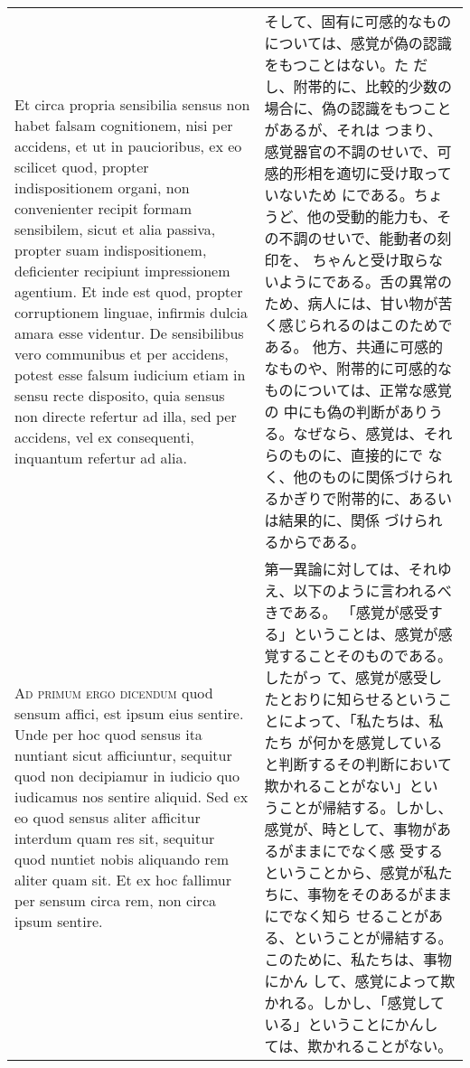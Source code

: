 \documentclass[paper=a4paper,fontsize=10pt,jafontsize=9pt,titlepage]{jlreq}
\begin{document}
\begin{longtable}{p{21em}p{21em}}
\\



Et circa propria sensibilia sensus
non habet falsam cognitionem, nisi per accidens, et ut in paucioribus,
ex eo scilicet quod, propter indispositionem organi, non convenienter
recipit formam sensibilem, sicut et alia passiva, propter suam
indispositionem, deficienter recipiunt impressionem agentium. Et inde
est quod, propter corruptionem linguae, infirmis dulcia amara esse
videntur. De sensibilibus vero communibus et per accidens, potest esse
falsum iudicium etiam in sensu recte disposito, quia sensus non directe
refertur ad illa, sed per accidens, vel ex consequenti, inquantum
refertur ad alia.


&

そして、固有に可感的なものについては、感覚が偽の認識をもつことはない。た
 だし、附帯的に、比較的少数の場合に、偽の認識をもつことがあるが、それは
 つまり、感覚器官の不調のせいで、可感的形相を適切に受け取っていないため
 にである。ちょうど、他の受動的能力も、その不調のせいで、能動者の刻印を、
 ちゃんと受け取らないようにである。舌の異常のため、病人には、甘い物が苦
 く感じられるのはこのためである。
他方、共通に可感的なものや、附帯的に可感的なものについては、正常な感覚の
 中にも偽の判断がありうる。なぜなら、感覚は、それらのものに、直接的にで
 なく、他のものに関係づけられるかぎりで附帯的に、あるいは結果的に、関係
 づけられるからである。


\\


{\scshape Ad primum ergo dicendum} quod sensum affici, est ipsum eius
sentire. Unde per hoc quod sensus ita nuntiant sicut afficiuntur,
sequitur quod non decipiamur in iudicio quo iudicamus nos sentire
aliquid. Sed ex eo quod sensus aliter afficitur interdum quam res sit,
sequitur quod nuntiet nobis aliquando rem aliter quam sit. Et ex hoc
fallimur per sensum circa rem, non circa ipsum sentire.


&


第一異論に対しては、それゆえ、以下のように言われるべきである。
「感覚が感受する」ということは、感覚が感覚することそのものである。したがっ
 て、感覚が感受したとおりに知らせるということによって、「私たちは、私たち
 が何かを感覚していると判断するその判断において欺かれることがない」とい
 うことが帰結する。しかし、感覚が、時として、事物があるがままにでなく感
 受するということから、感覚が私たちに、事物をそのあるがままにでなく知ら
 せることがある、ということが帰結する。このために、私たちは、事物にかん
 して、感覚によって欺かれる。しかし、「感覚している」ということにかんし
 ては、欺かれることがない。


\end{longtable}
\end{document}
